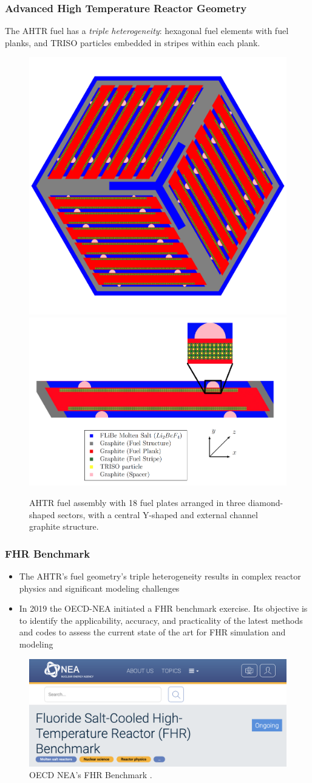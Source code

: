     \begin{frame}
    \frametitle{Advanced High Temperature Reactor Geometry}
    The AHTR fuel has a \emph{triple heterogeneity}: hexagonal fuel elements with 
    fuel planks, and TRISO particles embedded in stripes within each plank.
    \begin{figure}[]
        \includegraphics[width=0.49\linewidth]{../docs/figures/ahtr-fuel-element.png} 
        \includegraphics[width=0.49\linewidth]{figures/ahtr-plank.png}
        \caption{AHTR fuel assembly with 18 fuel plates arranged in 
        three diamond-shaped sectors, with a central Y-shaped and external channel 
        graphite structure.}
    \end{figure}
    \end{frame}

    \begin{frame}
    \frametitle{FHR Benchmark}
    \begin{itemize}
        \item The AHTR's fuel geometry's triple heterogeneity results in
        complex reactor physics and significant modeling challenges
        \item In 2019 the OECD-NEA initiated a FHR benchmark exercise. Its objective 
        is to identify the applicability, accuracy, and practicality of the latest 
        methods and codes to assess the current state of the art for FHR simulation 
        and modeling
    \end{itemize}
    \begin{figure}[]
        \includegraphics[width=0.7\linewidth]{figures/benchmark.png} 
        \caption{OECD NEA's FHR Benchmark \cite{petrovic_benchmark_2021}.}
    \end{figure}
    \end{frame}

